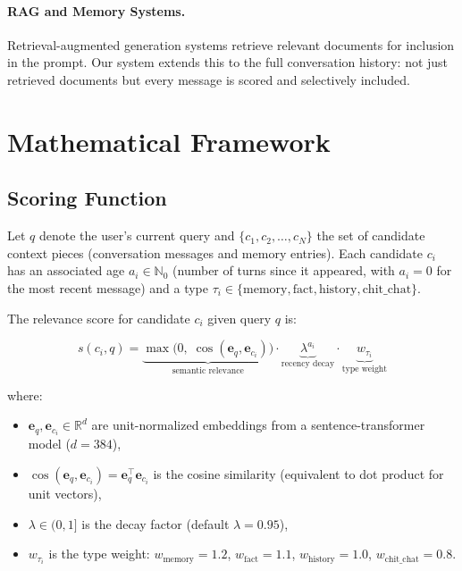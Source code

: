 \documentclass[11pt,a4paper]{article}
\begin{document}
\paragraph{RAG and Memory Systems.}
Retrieval-augmented generation systems retrieve relevant documents for inclusion
in the prompt. Our system extends this to the full conversation history: not just
retrieved documents but every message is scored and selectively included.

\section{Mathematical Framework}
\label{sec:math}

\subsection{Scoring Function}

Let $q$ denote the user's current query and $\{c_1, c_2, \ldots, c_N\}$ the set of
candidate context pieces (conversation messages and memory entries). Each candidate
$c_i$ has an associated age $a_i \in \mathbb{N}_0$ (number of turns since it appeared,
with $a_i = 0$ for the most recent message) and a type $\tau_i \in \{\text{memory},
\text{fact}, \text{history}, \text{chit\_chat}\}$.

The relevance score for candidate $c_i$ given query $q$ is:

\begin{equation}
\label{eq:score}
s(c_i, q) = \underbrace{\max\bigl(0,\; \cos(\mathbf{e}_q, \mathbf{e}_{c_i})\bigr)}_{\text{semantic relevance}} \cdot \underbrace{\lambda^{a_i}}_{\text{recency decay}} \cdot \underbrace{w_{\tau_i}}_{\text{type weight}}
\end{equation}

where:
\begin{itemize}
    \item $\mathbf{e}_q, \mathbf{e}_{c_i} \in \mathbb{R}^d$ are unit-normalized
    embeddings from a sentence-transformer model ($d = 384$),
    \item $\cos(\mathbf{e}_q, \mathbf{e}_{c_i}) = \mathbf{e}_q^\top \mathbf{e}_{c_i}$
    is the cosine similarity (equivalent to dot product for unit vectors),
    \item $\lambda \in (0, 1]$ is the decay factor (default $\lambda = 0.95$),
    \item $w_{\tau_i}$ is the type weight: $w_\text{memory} = 1.2$,
    $w_\text{fact} = 1.1$, $w_\text{history} = 1.0$, $w_\text{chit\_chat} = 0.8$.
\end{itemize}
\end{document}
